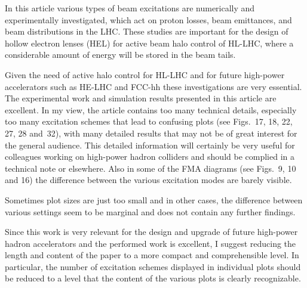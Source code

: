 \documentclass[aps
,prstab
,preprint,tightenlines
,amsfonts,amssymb,amsmath
]{revtex4-1}
\begin{document}
{\em

  In this article various types of beam excitations are numerically
  and experimentally investigated, which act on proton losses, beam
  emittances, and beam distributions in the LHC. These studies are
  important for the design of hollow electron lenses (HEL) for active
  beam halo control of HL-LHC, where a considerable amount of energy
  will be stored in the beam tails.

  Given the need of active halo control for HL-LHC and for future
  high-power accelerators such as HE-LHC and FCC-hh these
  investigations are very essential. The experimental work and
  simulation results presented in this article are excellent. In my
  view, the article contains too many technical details, especially
  too many excitation schemes that lead to confusing plots (see
  Figs.~17, 18, 22, 27, 28 and~32), with many detailed results that
  may not be of great interest for the general audience. This detailed
  information will certainly be very useful for colleagues working on
  high-power hadron colliders and should be complied in a technical
  note or elsewhere. Also in some of the FMA diagrams (see Figs.~9, 10
  and 16) the difference between the various excitation modes are
  barely visible.

  Sometimes plot sizes are just too small and in other cases, the
  difference between various settings seem to be marginal and does not
  contain any further findings.

  Since this work is very relevant for the design and upgrade of
  future high-power hadron accelerators and the performed work is
  excellent, I suggest reducing the length and content of the paper to
  a more compact and comprehensible level. In particular, the number
  of excitation schemes displayed in individual plots should be
  reduced to a level that the content of the various plots is clearly
  recognizable.
}
\end{document}

